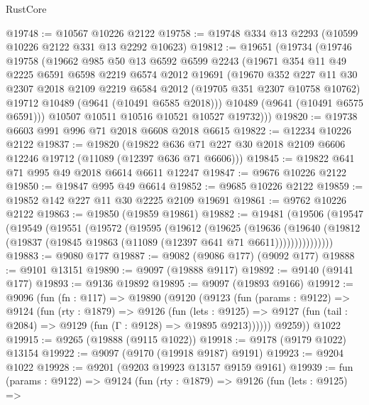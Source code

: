 \begin{lexlean}{RustCore}
\begin{coremodule}
@19748 := @10567 @10226 @2122
@19758 := @19748 @334 @13 @2293 (@10599 @10226 @2122 @331 @13 @2292 @10623)
@19812 := @19651
    (@19734
      (@19746
        @19758
        (@19662
          @985
          @50
          @13
          @6592
          @6599
          @2243
          (@19671
            @354
            @11
            @49
            @2225
            @6591
            @6598
            @2219
            @6574
            @2012
            @19691
            (@19670
              @352
              @227
              @11
              @30
              @2307
              @2018
              @2109
              @2219
              @6584
              @2012
              (@19705 @351 @2307 @10758 @10762)
              @19712
              @10489
              (@9641 (@10491 @6585 @2018)))
            @10489
            (@9641 (@10491 @6575 @6591)))
          @10507
          @10511
          @10516
          @10521
          @10527
          @19732)))
@19820 := @19738 @6603 @991 @996 @71 @2018 @6608 @2018 @6615
@19822 := @12234 @10226 @2122
@19837 := @19820
    (@19822 @636 @71 @227 @30 @2018 @2109 @6606 @12246 @19712 (@11089 (@12397 @636 @71 @6606)))
@19845 := @19822 @641 @71 @995 @49 @2018 @6614 @6611 @12247
@19847 := @9676 @10226 @2122
@19850 := @19847 @995 @49 @6614
@19852 := @9685 @10226 @2122
@19859 := @19852 @142 @227 @11 @30 @2225 @2109 @19691
@19861 := @9762 @10226 @2122
@19863 := @19850 (@19859 @19861)
@19882 := @19481
    (@19506
      (@19547
        (@19549
          (@19551
            (@19572
              (@19595
                (@19612
                  (@19625
                    (@19636
                      (@19640
                        (@19812 (@19837 (@19845 @19863 (@11089 (@12397 @641 @71 @6611)))))))))))))))
@19883 := @9080 @177
@19887 := @9082 (@9086 @177) (@9092 @177)
@19888 := @9101 @13151
@19890 := @9097 (@19888 @9117)
@19892 := @9140 (@9141 @177)
@19893 := @9136 @19892
@19895 := @9097 (@19893 @9166)
@19912 := @9096
    (fun (fn : @117) =>
    @19890
      (@9120
        (@9123
          (fun (params : @9122) =>
          @9124
            (fun (rty : @1879) =>
            @9126
              (fun (lets : @9125) =>
              @9127 (fun (tail : @2084) => @9129 (fun (Γ : @9128) => @19895 @9213))))))
        @9259))
    @1022
@19915 := @9265 (@19888 (@9115 @1022))
@19918 := @9178 (@9179 @1022) @13154
@19922 := @9097 (@9170 (@19918 @9187) @9191)
@19923 := @9204 @1022
@19928 := @9201 (@9203 @19923 @13157 @9159 @9161)
@19939 := fun (params : @9122) =>
  @9124
    (fun (rty : @1879) =>
    @9126
      (fun (lets : @9125) =>

\end{coremodule}
\end{lexlean}
